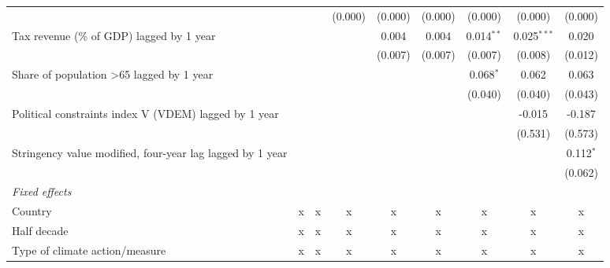 \begin{tabular}{lcccccccc}
                                                              &              &              & (0.000)       & (0.000)      & (0.000)      & (0.000)      & (0.000)       & (0.000)\\   
   Tax revenue (\% of GDP) lagged by 1 year                   &              &              &               & 0.004        & 0.004        & 0.014$^{**}$ & 0.025$^{***}$ & 0.020\\   
                                                              &              &              &               & (0.007)      & (0.007)      & (0.007)      & (0.008)       & (0.012)\\   
   Share of population >65 lagged by 1 year                   &              &              &               &              &              & 0.068$^{*}$  & 0.062         & 0.063\\   
                                                              &              &              &               &              &              & (0.040)      & (0.040)       & (0.043)\\   
   Political constraints index V (VDEM) lagged by 1 year      &              &              &               &              &              &              & -0.015        & -0.187\\   
                                                              &              &              &               &              &              &              & (0.531)       & (0.573)\\   
   Stringency value modified, four-year lag lagged by 1 year  &              &              &               &              &              &              &               & 0.112$^{*}$\\   
                                                              &              &              &               &              &              &              &               & (0.062)\\   
   \emph{Fixed effects}\\
   Country                                                    & x            & x            & x             & x            & x            & x            & x             & x\\  
   Half decade                                                & x            & x            & x             & x            & x            & x            & x             & x\\  
   Type of climate action/measure                             & x            & x            & x             & x            & x            & x            & x             & x\\  

\end{tabular}
